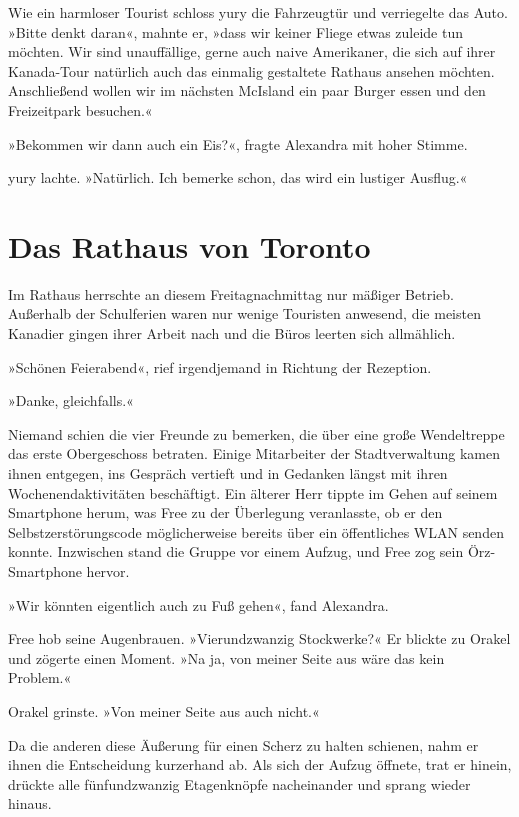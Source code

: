 Wie ein harmloser Tourist schloss yury die Fahrzeugtür und verriegelte das Auto. »Bitte denkt daran«, mahnte er, »dass wir keiner Fliege etwas zuleide tun möchten. Wir sind unauffällige, gerne auch naive Amerikaner, die sich auf ihrer Kanada-Tour natürlich auch das einmalig gestaltete Rathaus ansehen möchten. Anschließend wollen wir im nächsten McIsland ein paar Burger essen und den Freizeitpark besuchen.«

»Bekommen wir dann auch ein Eis?«, fragte Alexandra mit hoher Stimme.

yury lachte. »Natürlich. Ich bemerke schon, das wird ein lustiger Ausflug.«

\cleardoubleevenpage



\chapter{Das Rathaus von Toronto}

Im Rathaus herrschte an diesem Freitagnachmittag nur mäßiger Betrieb. Außerhalb der Schulferien waren nur wenige Touristen anwesend, die meisten Kanadier gingen ihrer Arbeit nach und die Büros leerten sich allmählich.

»Schönen Feierabend«, rief irgendjemand in Richtung der Rezeption.

»Danke, gleichfalls.«

Niemand schien die vier Freunde zu bemerken, die über eine große Wendeltreppe das erste Obergeschoss betraten. Einige Mitarbeiter der Stadtverwaltung kamen ihnen entgegen, ins Gespräch vertieft und in Gedanken längst mit ihren Wochenendaktivitäten beschäftigt. Ein älterer Herr tippte im Gehen auf seinem Smartphone herum, was Free zu der Überlegung veranlasste, ob er den Selbstzerstörungscode möglicherweise bereits über ein öffentliches WLAN senden konnte. Inzwischen stand die Gruppe vor einem Aufzug, und Free zog sein Örz-Smartphone hervor.

»Wir könnten eigentlich auch zu Fuß gehen«, fand Alexandra.

Free hob seine Augenbrauen. »Vierundzwanzig Stockwerke?« Er blickte zu Orakel und zögerte einen Moment. »Na ja, von meiner Seite aus wäre das kein Problem.«

Orakel grinste. »Von meiner Seite aus auch nicht.«

Da die anderen diese Äußerung für einen Scherz zu halten schienen, nahm er ihnen die Entscheidung kurzerhand ab. Als sich der Aufzug öffnete, trat er hinein, drückte alle fünfundzwanzig Etagenknöpfe nacheinander und sprang wieder hinaus.

